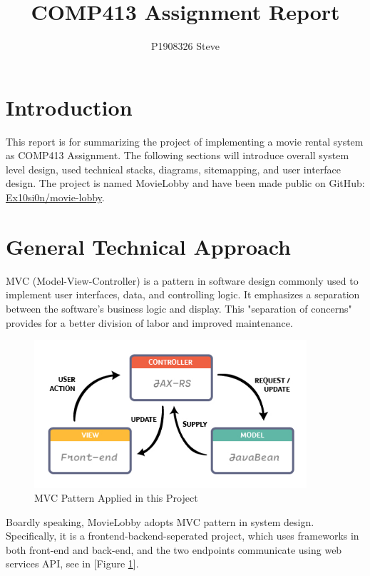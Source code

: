 \documentclass{article}
\title{COMP413 Assignment Report}
\author{P1908326 Steve}
\begin{document}
\maketitle

\section{Introduction}

This report is for summarizing the project of implementing a movie rental system as COMP413 Assignment. The following sections will introduce overall system level design, used technical stacks, diagrams, sitemapping, and user interface design. The project is named MovieLobby and have been made public on GitHub: \href{https://github.com/Ex10si0n/movie-lobby}{Ex10si0n/movie-lobby}.

\section{General Technical Approach}

MVC (Model-View-Controller) is a pattern in software design commonly used to implement user interfaces, data, and controlling logic. It emphasizes a separation between the software's business logic and display. This "separation of concerns" provides for a better division of labor and improved maintenance.\cite{mvc}

\begin{figure}[!htp]
\centering
\includegraphics[width=0.9\textwidth]{mvc.jpg}
\caption{\label{fig:mvc}MVC Pattern Applied in this Project}
\end{figure}

Boardly speaking, MovieLobby adopts MVC pattern in system design. Specifically, it is a frontend-backend-seperated project, which uses frameworks in both front-end and back-end, and the two endpoints communicate using web services API, see in [Figure \ref{fig:mvc}].
\end{document}

